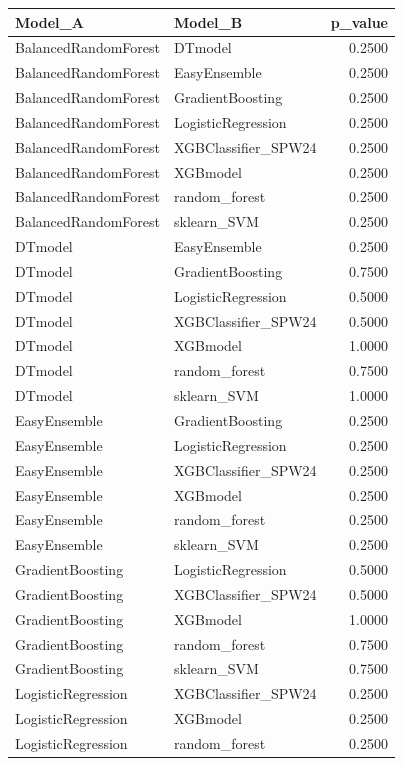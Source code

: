 \begin{table}[t]
\centering
\begin{tabular}{llr}
\toprule
Model_A & Model_B & p_value \\
\midrule
BalancedRandomForest & DTmodel & 0.2500 \\
BalancedRandomForest & EasyEnsemble & 0.2500 \\
BalancedRandomForest & GradientBoosting & 0.2500 \\
BalancedRandomForest & LogisticRegression & 0.2500 \\
BalancedRandomForest & XGBClassifier_SPW24 & 0.2500 \\
BalancedRandomForest & XGBmodel & 0.2500 \\
BalancedRandomForest & random_forest & 0.2500 \\
BalancedRandomForest & sklearn_SVM & 0.2500 \\
DTmodel & EasyEnsemble & 0.2500 \\
DTmodel & GradientBoosting & 0.7500 \\
DTmodel & LogisticRegression & 0.5000 \\
DTmodel & XGBClassifier_SPW24 & 0.5000 \\
DTmodel & XGBmodel & 1.0000 \\
DTmodel & random_forest & 0.7500 \\
DTmodel & sklearn_SVM & 1.0000 \\
EasyEnsemble & GradientBoosting & 0.2500 \\
EasyEnsemble & LogisticRegression & 0.2500 \\
EasyEnsemble & XGBClassifier_SPW24 & 0.2500 \\
EasyEnsemble & XGBmodel & 0.2500 \\
EasyEnsemble & random_forest & 0.2500 \\
EasyEnsemble & sklearn_SVM & 0.2500 \\
GradientBoosting & LogisticRegression & 0.5000 \\
GradientBoosting & XGBClassifier_SPW24 & 0.5000 \\
GradientBoosting & XGBmodel & 1.0000 \\
GradientBoosting & random_forest & 0.7500 \\
GradientBoosting & sklearn_SVM & 0.7500 \\
LogisticRegression & XGBClassifier_SPW24 & 0.2500 \\
LogisticRegression & XGBmodel & 0.2500 \\
LogisticRegression & random_forest & 0.2500 \\

\end{tabular}
\end{table}

